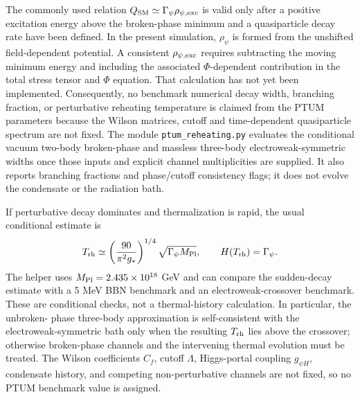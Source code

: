 \documentclass[epj]{svjour}
\begin{document}
The commonly used relation $Q_{\rm SM}\simeq\Gamma_\psi
\rho_{\psi,\rm exc}$ is valid only after a positive excitation
energy above the broken-phase minimum and a quasiparticle decay
rate have been defined. In the present simulation,
$\rho_\psi$ is formed from the unshifted field-dependent
potential. A consistent $\rho_{\psi,\rm exc}$ requires subtracting
the moving minimum energy and including the associated
$\Phi$-dependent contribution in the total stress tensor and
$\Phi$ equation. That calculation has not yet been implemented.
Consequently, no benchmark numerical decay width, branching
fraction, or perturbative reheating temperature is claimed from
the PTUM parameters because the Wilson matrices, cutoff and
time-dependent quasiparticle spectrum are not fixed. The module
\texttt{ptum\_reheating.py} evaluates the conditional vacuum
two-body broken-phase and massless three-body electroweak-symmetric
widths once those inputs and explicit channel multiplicities are
supplied. It also reports branching fractions and phase/cutoff
consistency flags; it does not evolve the condensate or the
radiation bath.

If perturbative decay dominates and thermalization is rapid, the
usual conditional estimate is
\begin{equation}
T_{\rm rh}\simeq
\left(\frac{90}{\pi^2g_*}\right)^{1/4}
\sqrt{\Gamma_\psi M_{\rm Pl}},
\qquad H(T_{\rm rh})=\Gamma_\psi.
\end{equation}
The helper uses $M_{\rm Pl}=2.435\times10^{18}$ GeV and can
compare the sudden-decay estimate with a 5 MeV BBN benchmark and
an electroweak-crossover benchmark. These are conditional checks,
not a thermal-history calculation. In particular, the unbroken-
phase three-body approximation is self-consistent with the
electroweak-symmetric bath only when the resulting $T_{\rm rh}$
lies above the crossover; otherwise broken-phase channels and
the intervening thermal evolution must be treated. The Wilson
coefficients $C_f$, cutoff $\Lambda$, Higgs-portal coupling
$g_{\psi H}$, condensate history, and competing non-perturbative
channels are not fixed, so no PTUM benchmark value is assigned.
\end{document}
